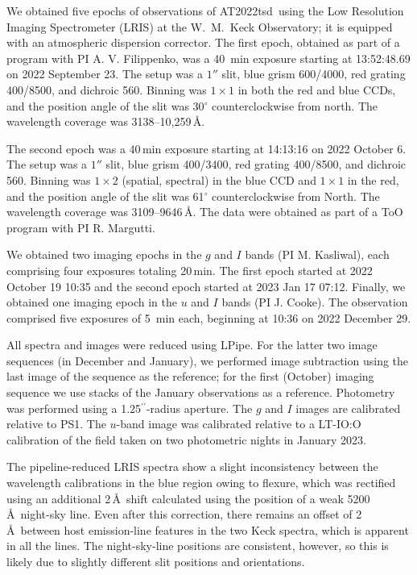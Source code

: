 \documentclass{nature_plusfigure}
\newcommand{\at}{AT2022tsd}
\newcommand{\arcsec}{$^{\prime\prime}$}
\begin{document}
\begin{methods}
We obtained five epochs of observations of \at\ using the Low Resolution Imaging Spectrometer (LRIS\cite{Oke1995}) at the W.~M.~Keck Observatory; it is equipped with an atmospheric dispersion corrector. The first epoch, obtained as part of a program with PI A. V. Filippenko, was a 40~min exposure starting at 13:52:48.69 on 2022 September 23. The setup was a $1''$ slit, blue grism 600/4000, red grating 400/8500, and dichroic 560. Binning was $1 \times 1$ in both the red and blue CCDs, and the position angle of the slit was 30$^\circ$ counterclockwise from north. The wavelength coverage was 3138--10,259\,\AA. 

The second epoch was a 40\,min exposure starting at 14:13:16 on 2022 October 6. The setup was a $1''$ slit, blue grism 400/3400, red grating 400/8500, and dichroic 560. Binning was $1 \times 2$ (spatial, spectral) in the blue CCD and $1\times1$ in the red, and the position angle of the slit was 61$^\circ$ counterclockwise from North. The wavelength coverage was 3109--9646\,\AA. The data were obtained as part of a ToO program with PI R. Margutti. 

We obtained two imaging epochs in the $g$ and $I$ bands (PI M. Kasliwal), each comprising four exposures totaling 20\,min. The first epoch started at 2022 October 19 10:35 and the second epoch started at 2023 Jan 17 07:12. 
Finally, we obtained one imaging epoch in the $u$ and $I$ bands (PI J. Cooke). The observation comprised five exposures of 5~min each, beginning at 10:36 on 2022 December 29.

All spectra and images were reduced using LPipe\cite{PerleyLPipe}.
For the latter two image sequences (in December and January), we performed image subtraction using the last image of the sequence as the reference; for the first (October) imaging sequence we use stacks of the January observations as a reference.  Photometry was performed using a 1.25\arcsec-radius aperture.  The $g$ and $I$ images are calibrated relative to PS1.  The $u$-band image was calibrated relative to a LT-IO:O calibration of the field taken on two photometric nights in January 2023.

The pipeline-reduced LRIS spectra show a slight inconsistency between the wavelength calibrations in the blue region owing to flexure, which was rectified using an additional 2\,\AA\ shift calculated using the position of a weak 5200\,\AA\ night-sky line.
Even after this correction, there remains an offset of 2\,\AA\ between host emission-line features in the two Keck spectra, which is apparent in all the lines. The night-sky-line positions are consistent, however, so this is likely due to slightly different slit positions and orientations. 


\end{methods}
\end{document}
